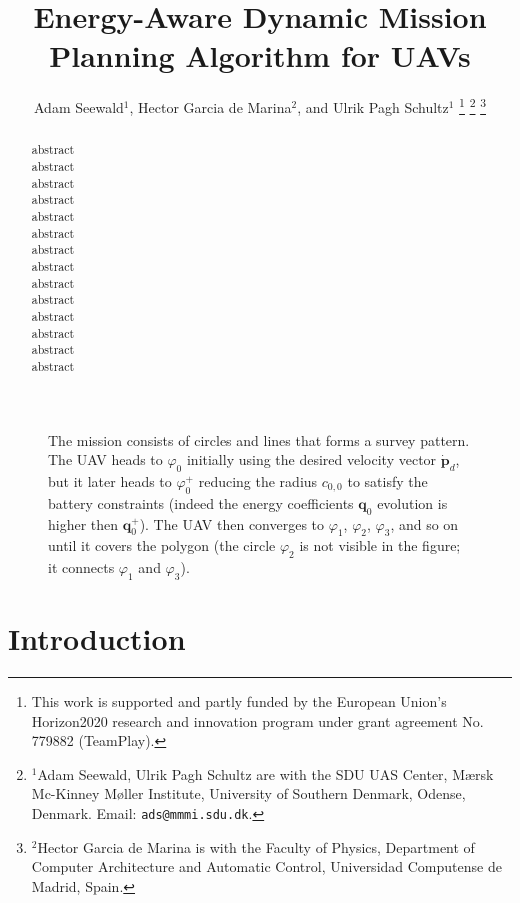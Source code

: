 \documentclass[letterpaper,10pt,conference]{ieeeconf}
\title{\LARGE \bf
Energy-Aware Dynamic Mission Planning Algorithm for UAVs
}
\author{
  Adam Seewald$^{1}$, Hector Garcia de Marina$^{2}$, and Ulrik Pagh Schultz$^{1}$
  \thanks{This work is supported and partly funded by the European Union's Horizon2020 research and innovation program under grant agreement No. 779882 (TeamPlay).
  }
  \thanks{$^{1}$Adam Seewald, Ulrik Pagh Schultz are with the SDU UAS Center, M{\ae}rsk Mc-Kinney M{\o}ller Institute, University of Southern Denmark, Odense, Denmark. Email: {\tt\small ads@mmmi.sdu.dk}.}
  \thanks{$^{2}$Hector Garcia de Marina is with the Faculty of Physics, Department of Computer Architecture and Automatic Control, Universidad Computense de Madrid, Spain.}
}
\newcommand{\figpath}{./figures}
\theoremstyle{definition}
\begin{document}
\maketitle

\thispagestyle{empty}
\pagestyle{empty}

\begin{abstract}

  abstract\\
  abstract\\
  abstract\\
  abstract\\
  abstract\\
  abstract\\
  abstract\\
  abstract\\
  abstract\\
  abstract\\
  abstract\\
  abstract\\
  abstract\\
  abstract
\end{abstract}

%
\IEEEpeerreviewmaketitle


\begin{figure*}[t]
  \centering
  
  \caption{The mission consists of circles and lines that forms a survey pattern. The UAV heads to $\varphi_0$ initially using the desired velocity vector $\dot{\mathbf{p}}_d$, but it later heads to $\varphi_0^+$ reducing the radius $c_{0,0}$ to satisfy the battery constraints (indeed the energy coefficients $\mathbf{q}_0$ evolution is higher then $\mathbf{q}_0^+$). The UAV then converges to $\varphi_1$, $\varphi_2$, $\varphi_3$, and so on until it covers the polygon (the circle $\varphi_2$ is not visible in the figure; it connects $\varphi_1$ and $\varphi_3$).}
  \label{fig:overview}
\end{figure*}

\section{Introduction}
\label{sec:intro}
\end{document}
